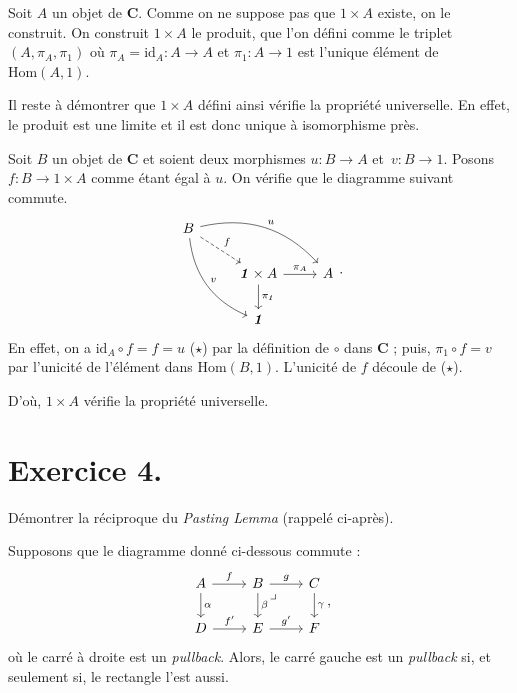 \documentclass{../../td}
\let\bm\boldsymbol
\newcommand\pullback{\arrow[very near start,description,phantom]{dr}{\lrcorner}}
\begin{document}
  Soit $A$ un objet de $\mathbf{C}$.
  Comme on ne suppose pas que $\bm{\mathit{1}} \times A$ existe, on le construit.
  On construit $\bm{\mathit{1}} \times A$ le produit, que l'on défini comme le triplet $(A, \pi_A, \pi_{\bm{\mathit{1}}})$ où $\pi_A = \mathrm{id}_A : A \to A$ et $\pi_{\bm{\mathit{1}}} : A \to \bm{\mathit{1}}$ est l'unique élément de $\mathrm{Hom}(A, \bm{\mathit{1}})$.

  Il reste à démontrer que $\bm{\mathit{1}} \times A$ défini ainsi vérifie la propriété universelle.
  En effet, le produit est une limite et il est donc unique à isomorphisme près.

  Soit $B$ un objet de $\mathbf{C}$ et soient deux morphismes $u : B \to A$ et~$v : B \to \bm{\mathit{1}}$.
  Posons $f : B \to \bm{\mathit{1}} \times A$ comme étant égal à $u$.
  On vérifie que le diagramme suivant commute.
  \[
  \begin{tikzcd}
    B \arrow[bend left]{drr}{u} \arrow[bend right]{ddr}{v} \arrow[dashed]{dr}{f}\\
    & \bm{\mathit{1}} \times A \arrow{r}{\pi_A} \arrow{d}{\pi_{\bm{\mathit{1}}}} & A\\
    & \bm{\mathit{1}}
  \end{tikzcd}
  .\] 
  En effet, on a $\mathrm{id}_A \circ f = f = u$ ($\star$) par la définition de $\circ$ dans $\mathbf{C}$ ; puis, $\pi_{\bm{\mathit{1}}} \circ f = v$ par l'unicité de l'élément dans $\mathrm{Hom}(B, \bm{\mathit{1}})$.
  L'unicité de $f$ découle de ($\star$).

  D'où, $\bm{\mathit{1}} \times A$ vérifie la propriété universelle.

  \chapter{Exercice 4.}

  \begin{slshape}
    \color{deepblue}
    Démontrer la réciproque du \textit{Pasting Lemma} (rappelé ci-après).
  \end{slshape}

  \begin{lemm}
    Supposons que le diagramme donné ci-dessous commute :
    \[
    \begin{tikzcd}
      A \arrow{r}{f}\arrow{d}{\alpha} & B\arrow{r}{g}\arrow{d}{\beta}\pullback & C\arrow{d}{\gamma}\\
      D \arrow{r}{f'} & E\arrow{r}{g'} & F
    \end{tikzcd}
    ,\] 
    où le carré à droite est un \textit{pullback}.
    Alors, le carré gauche est un \textit{pullback} si, et seulement si, le rectangle l'est aussi.
  \end{lemm}
\end{document}
